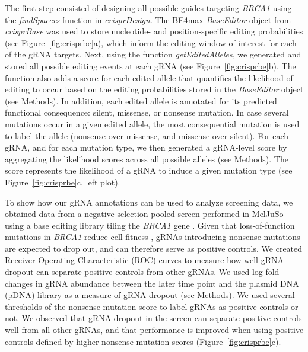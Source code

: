 \documentclass[pdftex,english,10pt]{article}
\begin{document}
The first step consisted of designing all possible guides targeting \textit{BRCA1} using the \textit{findSpacers} function in \textit{crisprDesign}. The BE4max \textit{BaseEditor} object from \textit{crisprBase} was used to store nucleotide- and position-specific editing probabilities (see Figure~\ref{fig:crisprbe}a), which inform the editing window of interest for each of the gRNA targets. Next, using the function \textit{getEditedAlleles}, we generated and stored all possible editing events at each gRNA (see Figure~\ref{fig:crisprbe}b). The function also adds a score for each edited allele that quantifies the likelihood of editing to occur based on the editing probabilities stored in the \textit{BaseEditor} object (see Methods). In addition, each edited allele is annotated for its predicted functional consequence: silent, missense, or nonsense mutation. In case several mutations occur in a given edited allele, the most consequential mutation is used to label the allele (nonsense over missense, and missense over silent).  For each gRNA, and for each mutation type, we then generated a gRNA-level score by aggregating the likelihood scores across all possible alleles (see Methods). The score represents the likelihood of a gRNA to induce a given mutation type (see Figure~\ref{fig:crisprbe}c, left plot). 

To show how our gRNA annotations can be used to analyze screening data, we obtained data from a negative selection pooled screen performed in MelJuSo using a base editing library tiling the \textit{BRCA1} gene \citep{hanna2021massively}. Given that loss-of-function mutations in \textit{BRCA1} reduce cell fitness \citep{findlay2018accurate}, gRNAs introducing nonsense mutations are expected to drop out, and can therefore serve as positive controls. We created Receiver Operating Characteristic (ROC) curves to measure how well gRNA dropout can separate positive controls from other gRNAs. We used log fold changes in gRNA abundance between the later time point and the plasmid DNA (pDNA) library as a measure of gRNA dropout (see Methods). We used several thresholds of the nonsense mutation score to label gRNAs as positive controls or not.  
We observed that gRNA dropout in the screen can separate positive controls well from all other gRNAs, and that performance is improved when using positive controls defined by higher nonsense mutation scores (Figure~\ref{fig:crisprbe}c). 
\end{document}

